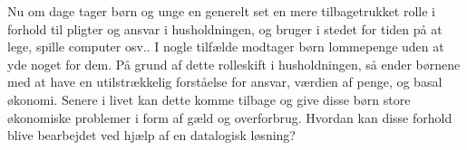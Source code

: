Nu om dage tager børn og unge en generelt set en mere tilbagetrukket rolle i forhold til pligter og ansvar i husholdningen, og bruger i stedet for tiden på at lege, spille computer osv.. I nogle tilfælde modtager børn lommepenge uden at yde noget for dem\cite{Boerneliv}. På grund af dette rolleskift i husholdningen, så ender børnene med at have en utilstrækkelig forståelse for ansvar, værdien af penge, og basal økonomi\cite{BusinessDK2}. Senere i livet kan dette komme tilbage og give disse børn store økonomiske problemer i form af gæld og overforbrug. Hvordan kan disse forhold blive bearbejdet ved hjælp af en datalogisk løsning?